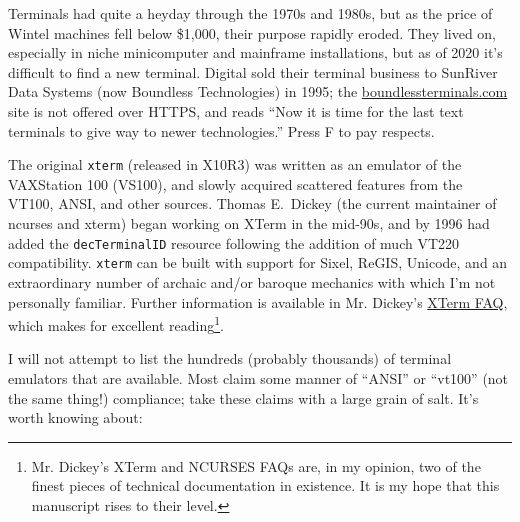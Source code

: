 Terminals had quite a heyday through the 1970s and 1980s, but as the price of
Wintel machines fell below \$1,000, their purpose rapidly eroded. They lived on,
especially in niche minicomputer and mainframe installations, but as of 2020 it's
difficult to find a new terminal. Digital sold their terminal business to SunRiver
Data Systems (now Boundless Technologies) in 1995; the \url{boundlessterminals.com}
site is not offered over HTTPS, and reads ``Now it is time for the last text
terminals to give way to newer technologies\cite{boundless}.'' Press F to pay
respects.

The original \texttt{xterm} (released in X10R3) was written as an emulator of
the VAXStation 100 (VS100), and slowly acquired scattered features from the
VT100, ANSI, and other sources\cite{xtermfaq}. Thomas E.\ Dickey (the current
maintainer of \Gls{ncurses} and xterm) began working on XTerm in the mid-90s,
and by 1996 had added the \texttt{decTerminalID} resource following the
addition of much VT220 compatibility. \texttt{xterm} can be built with support
for Sixel, ReGIS, Unicode, and an extraordinary number of archaic and/or
baroque mechanics with which I'm not personally familiar. Further information
is available in Mr. Dickey's
\href{https://invisible-island.net/xterm/xterm.faq.html}{XTerm FAQ}, which
makes for excellent reading\footnote{Mr. Dickey's XTerm and NCURSES FAQs are,
in my opinion, two of the finest pieces of technical documentation in
existence. It is my hope that this manuscript rises to their level.}.

I will not attempt to list the hundreds (probably thousands) of terminal
emulators that are available. Most claim some manner of ``ANSI'' or ``vt100''
(not the same thing!) compliance; take these claims with a large grain of salt.
It's worth knowing about:

